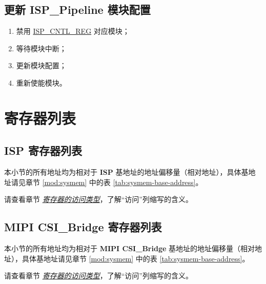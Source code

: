 \documentclass[main\_\_CN.tex]{subfiles}
\begin{document}
\subsection{更新 ISP\_Pipeline 模块配置}
\begin{enumerate}
    \item 禁用 \hyperref[regdesc:ISPCNTLREG]{ISP\_CNTL\_REG} 对应模块；
    \item 等待模块中断；
    \item 更新模块配置；
    \item 重新使能模块。
\end{enumerate}





\newpage
\hypertarget{isp-reg-summ}{}
\section{寄存器列表}
\label{sec:isp-reg-summ}

\subsection{ISP 寄存器列表}

本小节的所有地址均为相对于 \textbf{ISP} 基地址的地址偏移量（相对地址），具体基地址请见章节 \ref{mod:sysmem} \textit{} 中的表 \ref{tab:sysmem-base-address}。

请查看章节 \hyperref[glossary-access-types]{\textit{寄存器的访问类型}}，了解“访问”列缩写的含义。





\subsection{MIPI CSI\_Bridge 寄存器列表}

本小节的所有地址均为相对于 \textbf{MIPI CSI\_Bridge} 基地址的地址偏移量（相对地址），具体基地址请见章节 \ref{mod:sysmem} \textit{} 中的表 \ref{tab:sysmem-base-address}。

请查看章节 \hyperref[glossary-access-types]{\textit{寄存器的访问类型}}，了解“访问”列缩写的含义。
\end{document}
